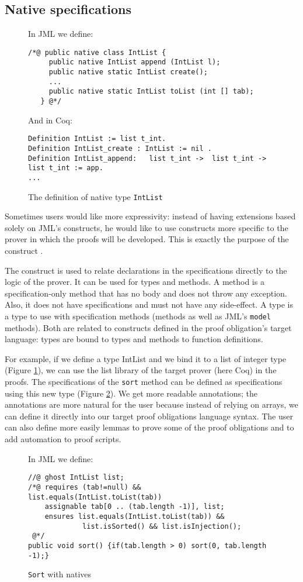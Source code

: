 \subsection{Native specifications}
\begin{figure}[t!]
{\small In JML we define:
\begin{verbatim}
/*@ public native class IntList {
     public native IntList append (IntList l);
     public native static IntList create();
     ...
     public native static IntList toList (int [] tab);
   } @*/ \end{verbatim}}

{\small And in Coq:
\begin{verbatim}
Definition IntList := list t_int.
Definition IntList_create : IntList := nil .  
Definition IntList_append:   list t_int ->  list t_int -> list t_int := app.
... \end{verbatim}}
\caption{The definition of native type \texttt{IntList}}\label{CoqAnnot} 
\end{figure}
Sometimes users would like more expressivity: instead of having 
 extensions based solely on JML's constructs, he would like 
to use constructs more specific to the prover in which the proofs will be
developed. This is 
exactly the purpose of the \native construct \cite{Charles06}.

The \native construct is used to relate declarations in
the specifications directly to the logic of the prover. It can be used 
for types and methods.
A \native method is a specification-only method that has no body and
 does not throw any exception.
Also, it does not have specifications and must not have any side-effect. 
A \native type is a type to use with specification methods 
(\native methods as well as JML's {\tt model} methods). 
Both are related to constructs 
defined in the proof obligation's target language: 
\native types are bound to 
types and \native methods to function definitions.


For example, if we define a \native type IntList and we bind it to a 
list of integer type (Figure \ref{CoqAnnot}), 
we can use the list library of the target prover (here Coq) 
in the proofs. The specifications of the
{\tt sort} method can be defined as specifications using this new type 
(Figure \ref{sortnat}). We get more readable annotations;
the annotations are more natural for the user because instead
 of relying on arrays, we can define it directly into
our target proof obligations language syntax.
The user can also define more easily lemmas to prove some of the proof
obligations and to add automation to proof scripts.


\begin{figure}[t!]
{\small In JML we define:
\begin{verbatim}
//@ ghost IntList list;
/*@ requires (tab!=null) && list.equals(IntList.toList(tab))
    assignable tab[0 .. (tab.length -1)], list;
    ensures list.equals(IntList.toList(tab)) &&
             list.isSorted() && list.isInjection();
 @*/
public void sort() {if(tab.length > 0) sort(0, tab.length -1);}\end{verbatim}}
\caption{\texttt{Sort} with natives}\label{sortnat} 
\end{figure}




